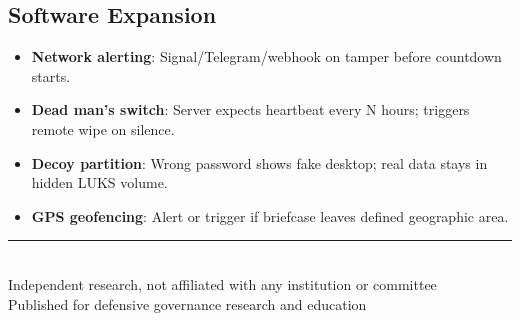 \documentclass[11pt,letterpaper]{article}
\begin{document}
\subsection{Software Expansion}
\begin{itemize}
  \item \textbf{Network alerting}: Signal/Telegram/webhook on tamper before countdown starts.
  \item \textbf{Dead man's switch}: Server expects heartbeat every N hours; triggers remote wipe on silence.
  \item \textbf{Decoy partition}: Wrong password shows fake desktop; real data stays in hidden LUKS volume.
  \item \textbf{GPS geofencing}: Alert or trigger if briefcase leaves defined geographic area.
\end{itemize}


\vfill
\begin{center}
\small\color{softslate}\sffamily
\rule{0.5\textwidth}{0.4pt}\\[0.5em]
Independent research, not affiliated with any institution or committee\\
Published for defensive governance research and education
\end{center}
\end{document}
